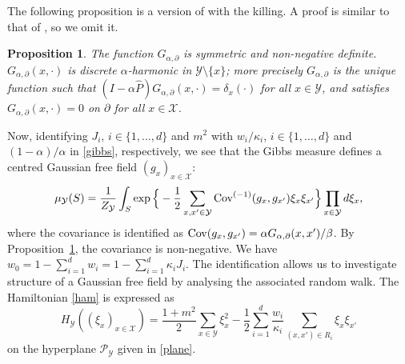 \documentclass[a4paper,11pt]{article}
\theoremstyle{plain}
\newtheorem{proposition}[theorem]{Proposition}
\theoremstyle{definition}
\begin{document}

The following proposition is a version of
\cite[Proposition 1.2]{BP25} with the killing.
A proof is similar to that of \cite{BP25}, so we
omit it.

\begin{proposition}\label{pro:nonneg}
  The function $G_{\alpha,\partial}$ is symmetric and
  non-negative definite. $G_{\alpha,\partial}(x,\cdot)$
  is discrete $\alpha$-harmonic in $\mathcal{Y}\setminus\{x\}$;
  more precisely $G_{\alpha,\partial}$ is the unique
  function such that
  $(I-\alpha\hat{P})G_{\alpha,\partial}(x,\cdot)=\delta_x(\cdot)$
  for all $x\in\mathcal{Y}$, and satisfies
  $G_{\alpha,\partial}(x,\cdot)=0$ on $\partial$ for all
  $x\in \mathcal{X}$.
\end{proposition}  



Now, identifying $J_i$, $i\in\{1,\ldots,d\}$ and
$m^2$ with $w_i/\kappa_i$, $i\in\{1,\ldots,d\}$ and
$(1-\alpha)/\alpha$ in \eqref{gibbs}, respectively,
we see that the Gibbs measure defines a centred Gaussian
free field $(g_x)_{x\in \mathcal{X}}$:
\[
  \mu_\mathcal{Y}(S)=\frac{1}{Z_\mathcal{Y}}
  \int_S\exp\Big\{-\frac{1}{2}
  \sum_{x,x'\in\mathcal{Y}}{\rm Cov}^{(-1)}(g_x,g_{x'})
  \xi_x\xi_{x'}\Big\}\prod_{x\in\mathcal{Y}} d\xi_x,
\]
where the covariance is identified as
${\rm Cov}(g_x,g_{x'})=\alpha G_{\alpha,\partial}(x,x')/\beta$.
By Proposition~\ref{pro:nonneg}, the covariance is
non-negative. We have
$w_0=1-\sum_{i=1}^dw_i=1-\sum_{i=1}^d\kappa_iJ_i$.
The identification allows us to investigate structure
of a Gaussian free field by analysing the associated
random walk. The Hamiltonian \eqref{ham} is expressed as
\begin{equation}\label{ham_rw}
  H_\mathcal{Y}((\xi_x)_{x\in\mathcal{X}})
  =\frac{1+m^2}{2}\sum_{x\in\mathcal{Y}}\xi_x^2
  -\frac{1}{2}\sum_{i=1}^d\frac{w_i}{\kappa_i}\sum_{(x,x')\in R_i}
  \xi_x\xi_{x'}
\end{equation}
on the hyperplane $\mathcal{P}_{\mathcal{Y}}$ given
in \eqref{plane}.
\end{document}
